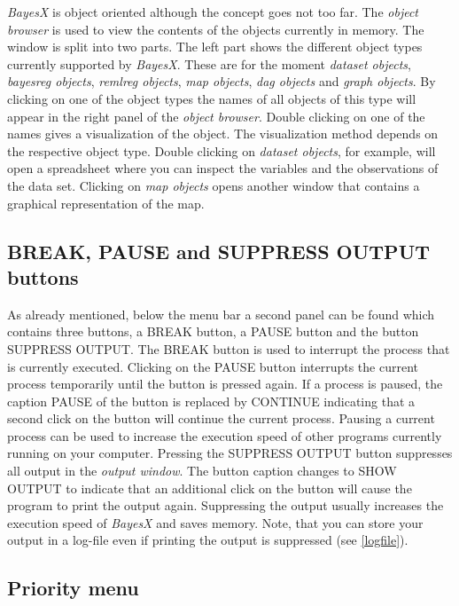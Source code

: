{\em BayesX} is object oriented although the concept goes not too
far. The {\em object browser} is used to view the contents of the
objects currently in memory. The window is split into two parts.
The left part shows the different object types currently supported
by {\em BayesX}. These are for the moment {\em dataset objects},
{\em bayesreg objects}, {\em remlreg objects}, {\em map objects},
{\em dag objects} and {\em graph objects}. By clicking on one of
the object types the names of all objects of this type will appear
in the right panel of the {\em object browser}. Double clicking on one
of the names gives a visualization of the object. The
visualization method depends on the respective object type. Double
clicking on {\em dataset objects}, for example, will open a
spreadsheet where you can inspect the variables and the
observations of the data set. Clicking on {\em map objects} opens
another window that contains a graphical representation of the
map.

\subsection{BREAK, PAUSE and SUPPRESS OUTPUT buttons}
\label{buttons}  
 
 

As already mentioned, below the menu bar a second panel can be
found which contains three buttons, a BREAK button, a PAUSE button
and the button SUPPRESS OUTPUT. The BREAK button is used to
interrupt the process that is currently executed. Clicking on the
PAUSE button interrupts the current process temporarily until the
button is pressed again. If a process is paused, the caption PAUSE
of the button is replaced by CONTINUE indicating that a second
click on the button will continue the current process. Pausing a
current process can be used to increase the execution speed of
other programs currently running on your computer. Pressing the
SUPPRESS OUTPUT button suppresses all output in the {\em output
window}. The button caption changes to SHOW OUTPUT to indicate
that an additional click on the button will cause the  program to
print the output again. Suppressing the output usually increases
the execution speed of {\em BayesX} and saves memory. Note, that
you can store your output in a log-file even if printing the
output is suppressed (see \autoref{logfile}).

\subsection{Priority menu}
\label{prioritymenu} 

